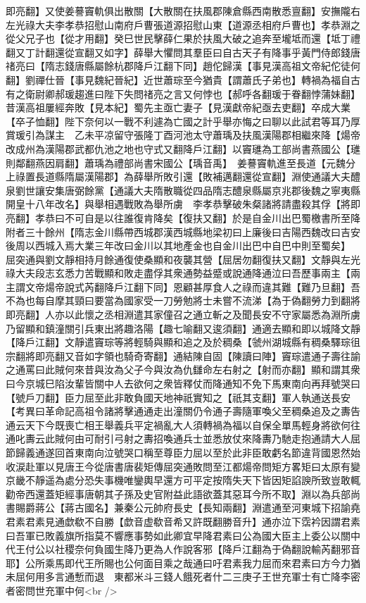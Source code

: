 即亮翻】又使姜謩竇軌俱出散關【大散關在扶風郡陳倉縣西南散悉亶翻】安撫隴右左光祿大夫李孝恭招慰山南府戶曹張道源招慰山東【道源丞相府戶曹也】孝恭淵之從父兄子也【從才用翻】癸巳世民擊薛仁果於扶風大破之追奔至壠坻而還【坻丁禮翻又丁計翻還從宣翻又如字】薛舉大懼問其羣臣曰自古天子有降事乎黃門侍郎錢唐禇亮曰【隋志錢唐縣屬餘杭郡降戶江翻下同】趙佗歸漢【事見漢高祖文帝紀佗徒何翻】劉禪仕晉【事見魏紀晉紀】近世蕭琮至今猶貴【謂蕭氏子弟也】轉禍為福自古有之衛尉卿郝瑗趨進曰陛下失問禇亮之言又何悖也【郝呼各翻瑗于眷翻悖蒲妹翻】昔漢高祖屢經奔敗【見本紀】蜀先主亟亡妻子【見漢獻帝紀亟去吏翻】卒成大業【卒子恤翻】陛下奈何以一戰不利遽為亡國之計乎舉亦悔之曰聊以此試君等耳乃厚賞瑗引為謀主　乙未平凉留守張隆丁酉河池太守蕭瑀及扶風漢陽郡相繼來降【煬帝改成州為漢陽郡武都仇池之地也守式又翻降戶江翻】以竇璡為工部尚書燕國公【璡則鄰翻燕因肩翻】蕭瑀為禮部尚書宋國公【瑀音禹】　姜謩竇軌進至長道【元魏分上祿置長道縣隋屬漢陽郡】為薛舉所敗引還【敗補邁翻還從宣翻】淵使通議大夫醴泉劉世讓安集唐弼餘黨【通議大夫隋散職從四品隋志醴泉縣屬京兆郡後魏之寧夷縣開皇十八年改名】與舉相遇戰敗為舉所虜　李孝恭擊破朱粲諸將請盡殺其俘【將即亮翻】孝恭曰不可自是以往誰復肯降矣【復扶又翻】於是自金川出巴蜀檄書所至降附者三十餘州【隋志金川縣帶西城郡漢西城縣地梁初曰上廉後曰吉陽西魏改曰吉安後周以西城入焉大業三年改曰金川以其地產金也自金川出巴中自巴中則至蜀矣】　屈突通與劉文靜相持月餘通復使桑顯和夜襲其營【屈居勿翻復扶又翻】文靜與左光祿大夫段志玄悉力苦戰顯和敗走盡俘其衆通勢益蹙或說通降通泣曰吾歷事兩主【兩主謂文帝煬帝說式芮翻降戶江翻下同】恩顧甚厚食人之祿而違其難【難乃旦翻】吾不為也每自摩其頸曰要當為國家受一刀勞勉將士未嘗不流涕【為于偽翻勞力到翻將即亮翻】人亦以此懷之丞相淵遣其家僮召之通立斬之及聞長安不守家屬悉為淵所虜乃留顯和鎮潼關引兵東出將趣洛陽【趣七喻翻又逡須翻】通適去顯和即以城降文靜【降戶江翻】文靜遣竇琮等將輕騎與顯和追之及於稠桑【虢州湖城縣有稠桑驛琮徂宗翻將即亮翻又音如字領也騎奇寄翻】通結陳自固【陳讀曰陣】竇琮遣通子壽往諭之通罵曰此賊何來昔與汝為父子今與汝為仇讎命左右射之【射而亦翻】顯和謂其衆曰今京城巳陷汝輩皆關中人去欲何之衆皆釋仗而降通知不免下馬東南向再拜號哭曰【號戶刀翻】臣力屈至此非敢負國天地神祇實知之【祇其支翻】軍人執通送長安　【考異曰革命記高祖令諸將擊通通走出潼關仍令通子壽隨軍喚父至稠桑追及之夀告通云天下今既喪亡相王舉義兵平定禍亂大人須轉禍為福以自保全單馬輕身將欲何往通叱夀云此賊何由可耐引弓射之夀招喚通兵士並悉放仗來降夀乃馳走抱通請大人屈節歸義通遂回首東南向泣號哭口稱至尊臣力屈以至於此非臣敢虧名節違背國恩然始收涙赴軍以見唐王今從唐書唐裴矩傳屈突通敗問至江都煬帝問矩方畧矩曰太原有變京畿不靜遥為處分恐失事機唯鑾輿早還方可平定按隋失天下皆因矩諂諛所致豈敢輒勸帝西還蓋矩經事唐朝其子孫及史官附益此語欲蓋其惡耳今所不取】淵以為兵部尚書賜爵蔣公【蔣古國名】兼秦公元帥府長史【長知兩翻】淵遣通至河東城下招諭堯君素君素見通歔欷不自勝【歔音虚欷音希又許既翻勝音升】通亦泣下霑衿因謂君素曰吾軍已敗義旗所指莫不響應事勢如此卿宜早降君素曰公為國大臣主上委公以關中代王付公以社稷奈何負國生降乃更為人作說客邪【降戶江翻為于偽翻說輸芮翻邪音耶】公所乘馬即代王所賜也公何面目乘之哉通曰吁君素我力屈而來君素曰方今力猶未屈何用多言通慙而退　東都米斗三錢人餓死者什二三庚子王世充軍士有亡降李密者密問世充軍中何<br />
